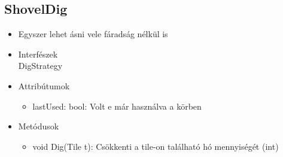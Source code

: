 \subsection{ShovelDig}
\begin{itemize}
	\item Egyszer lehet ásni vele fáradság nélkül is\\
\item Interfészek\\
DigStrategy

\item Attribútumok
\begin{itemize}
	\item lastUsed: bool: Volt e már használva a körben
\end{itemize}
\item Metódusok
\begin{itemize}
	\item void Dig(Tile t): Csökkenti a tile-on található hó mennyiségét (int)
\end{itemize}
\end{itemize}

